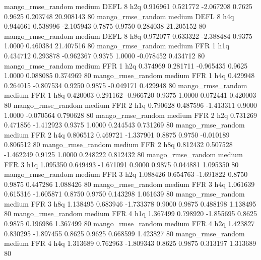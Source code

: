 mango_rmse_random     medium     DEFL                 8                  h2q  0.916961 0.521772 -2.067208 0.7625 0.9625  0.203748   20.908143 80
mango_rmse_random     medium     DEFL                 8                  h4q  0.944661 0.538996 -2.105943 0.7875 0.9750  0.284038   21.205152 80
mango_rmse_random     medium     DEFL                 8                  h8q  0.972077 0.633322 -2.388484 0.9375 1.0000  0.460384   21.407516 80
mango_rmse_random     medium      FFR                 1                  h1q  0.434712 0.293878 -0.962367 0.9375 1.0000 -0.078452    0.434712 80
mango_rmse_random     medium      FFR                 1                  h2q  0.374969 0.281711 -0.965435 0.9625 1.0000  0.088085    0.374969 80
mango_rmse_random     medium      FFR                 1                  h4q  0.429948 0.264015 -0.807534 0.9250 0.9875 -0.049171    0.429948 80
mango_rmse_random     medium      FFR                 1                  h8q  0.420003 0.291162 -0.966720 0.9375 1.0000  0.072441    0.420003 80
mango_rmse_random     medium      FFR                 2                  h1q  0.790628 0.487596 -1.413311 0.9000 1.0000 -0.070564    0.790628 80
mango_rmse_random     medium      FFR                 2                  h2q  0.731269 0.471856 -1.412923 0.9375 1.0000  0.244543    0.731269 80
mango_rmse_random     medium      FFR                 2                  h4q  0.806512 0.469721 -1.337901 0.8875 0.9750 -0.010189    0.806512 80
mango_rmse_random     medium      FFR                 2                  h8q  0.812432 0.507528 -1.462249 0.9125 1.0000  0.248222    0.812432 80
mango_rmse_random     medium      FFR                 3                  h1q  1.095350 0.649493 -1.671091 0.9000 0.9875  0.044881    1.095350 80
mango_rmse_random     medium      FFR                 3                  h2q  1.088426 0.654763 -1.691822 0.8750 0.9875  0.447286    1.088426 80
mango_rmse_random     medium      FFR                 3                  h4q  1.061639 0.615316 -1.605871 0.8750 0.9750  0.143298    1.061639 80
mango_rmse_random     medium      FFR                 3                  h8q  1.138495 0.683946 -1.733378 0.9000 0.9875  0.488198    1.138495 80
mango_rmse_random     medium      FFR                 4                  h1q  1.367499 0.798920 -1.855695 0.8625 0.9875  0.196986    1.367499 80
mango_rmse_random     medium      FFR                 4                  h2q  1.423827 0.830295 -1.897455 0.8625 0.9625  0.668599    1.423827 80
mango_rmse_random     medium      FFR                 4                  h4q  1.313689 0.762963 -1.809343 0.8625 0.9875  0.313197    1.313689 80
